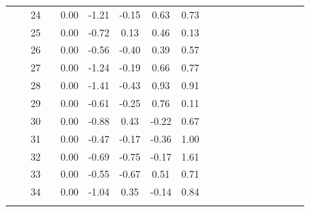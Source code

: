 \documentclass[a4paper，11pt，oneside，openany]{jsbook}
\newcommand{\bhline}[1]{\noalign{\hrule height #1}}
\begin{document}
\begin{table}[h!]
\begin{center}
\begin{tabular}{ccccccccccccccccccc}
 &  & 24 &  & 0.00 & -1.21 & -0.15 & 0.63  & 0.73 \\
 &  & 25 &  & 0.00 & -0.72 & 0.13  & 0.46  & 0.13 \\
 &  & 26 &  & 0.00 & -0.56 & -0.40 & 0.39  & 0.57 \\
 &  & 27 &  & 0.00 & -1.24 & -0.19 & 0.66  & 0.77 \\
 &  & 28 &  & 0.00 & -1.41 & -0.43 & 0.93  & 0.91 \\
 &  & 29 &  & 0.00 & -0.61 & -0.25 & 0.76  & 0.11 \\
 &  & 30 &  & 0.00 & -0.88 & 0.43  & -0.22 & 0.67 \\
 &  & 31 &  & 0.00 & -0.47 & -0.17 & -0.36 & 1.00 \\
 &  & 32 &  & 0.00 & -0.69 & -0.75 & -0.17 & 1.61 \\
 &  & 33 &  & 0.00 & -0.55 & -0.67 & 0.51  & 0.71 \\
 &  & 34 &  & 0.00 & -1.04 & 0.35  & -0.14 & 0.84\\
\bhline{1pt}
\end{tabular}
\label{t10param2}
\end{center}
\end{table}
\end{document}
